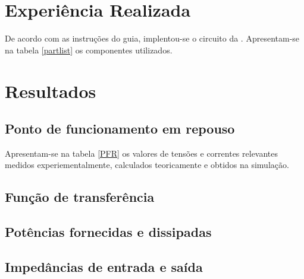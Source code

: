 \documentclass[%
  reprint,
  nofootinbib,
  amsmath,amssymb,
  aps,
  10pt,
  a4paper
]{revtex4-1}
\begin{document}
\section{Experiência Realizada}
\label{s:expreal}
De acordo com as instruções do guia, implentou-se o circuito da . Apresentam-se na tabela \ref{partlist} os componentes utilizados.




\section{Resultados}
\label{s:resul}

\subsection{Ponto de funcionamento em repouso}
Apresentam-se na tabela \ref{PFR} os valores de tensões e correntes relevantes medidos experiementalmente, calculados teoricamente e obtidos na simulação.

\subsection{Função de transferência}
\subsection{Potências fornecidas e dissipadas}
\subsection{Impedâncias de entrada e saída}
\end{document}
